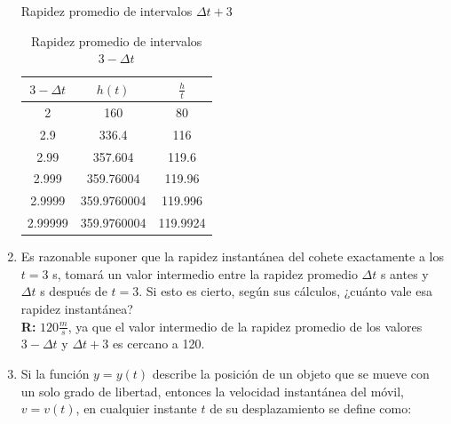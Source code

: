 \documentclass[12pt]{article}
\begin{document}
\begin{enumerate}
\begin{table}[h]
\begin{center}
\begin{minipage}{0.45\linewidth}
            \caption{Rapidez promedio de intervalos $\Delta t + 3$}

            \label{tab:rapprom+3}

            \end{minipage}

            \hspace{0.05\linewidth} 

            \begin{minipage}{0.45\linewidth}

            \centering

            \begin{tabular}{| c | c | c |}\hline %
                $3 - \Delta t$  & $h(t)$  &$\frac{h}{t}$\\ \hline
                2&160&80 \\
                2.9&336.4&116\\
                2.99&357.604&119.6\\
                2.999&359.76004&119.96\\
                2.9999&359.9760004&119.996\\
                2.99999&359.9760004&119.9924\\ \hline
            \end{tabular}

            \caption{Rapidez promedio de intervalos $3 - \Delta t$}

            \label{tab:rapprom-3}

            \end{minipage}

        \end{center}

    \end{table}

\item Es razonable suponer que la rapidez instantánea del cohete exactamente a los $t = 3$ s, tomará un valor intermedio entre la rapidez promedio $\Delta t$ s antes y $\Delta t$ s después de $t = 3$. Si esto es cierto, según sus cálculos, ¿cuánto vale esa rapidez instantánea?\\
    
    {\bf R:} $120 \frac{m}{s}$, ya que el valor intermedio de la rapidez promedio de los valores $3- \Delta t$ y $\Delta t +3$ es cercano a 120.\par
    
\item Si la función $y = y(t)$ describe la posición de un objeto que se mueve con un solo grado de libertad, entonces la velocidad instantánea del móvil, $v = v(t)$, en cualquier instante $t$ de su desplazamiento se define como:
  

\end{enumerate}
\end{document}
